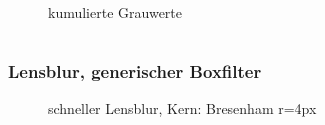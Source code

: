 \documentclass[a4paper,12pt]{article}
\begin{document}
\begin{figure}[htbp]
\caption{kumulierte Grauwerte}%
\label{figure_kumuliert}
\end{figure}


\begin{verbatim}
\end{verbatim}


\subsubsection{Lensblur, generischer Boxfilter}

\begin{figure}[htbp]
\caption{schneller Lensblur, Kern: Bresenham r=4px}
\label{figure_lensblur_box}
\end{figure}
\end{document}
